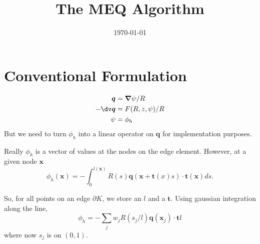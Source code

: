 \documentclass[prb,aps,amssymb,amsmath,a4paper]{revtex4}
\providecommand{\grad}{\bm{\nabla}}
\begin{document}
\date{\today}

\title{The MEQ Algorithm}

\maketitle

\section{Conventional Formulation}
\begin{eqnarray}
\bm{q} &= \grad \psi / R \\
-\dv \bm{q}  &= F(R,z,\psi) / R\\
\psi &= \phi_h 
\end{eqnarray}
But we need to turn $\phi_h$ into a linear operator on $\bm{q}$ for implementation purposes.

Really $\phi_h$ is a vector of values at the nodes on the edge element. However, at a given node $\bm{x}$
\begin{equation}
\phi_h(\bm{x}) = - \int_0^{l(\bm{x})} R(s) \bm{q}( \bm{x} + \bm{t}(x) s )\cdot\bm{t}(\bm{x}) ds.
\end{equation}

So, for all points on an edge $\partial K$, we store an $l$ and a $\bm{t}$.
Using gaussian integration along the line,
		\begin{equation}
		\phi_h = - \sum_j w_j R(s_j/l) \bm{q}(\bm{x}_j)\cdot\bm{t} l
		\label{<++>}
		\end{equation}
		where now $s_j$ is on $(0,1)$. 
\end{document}
